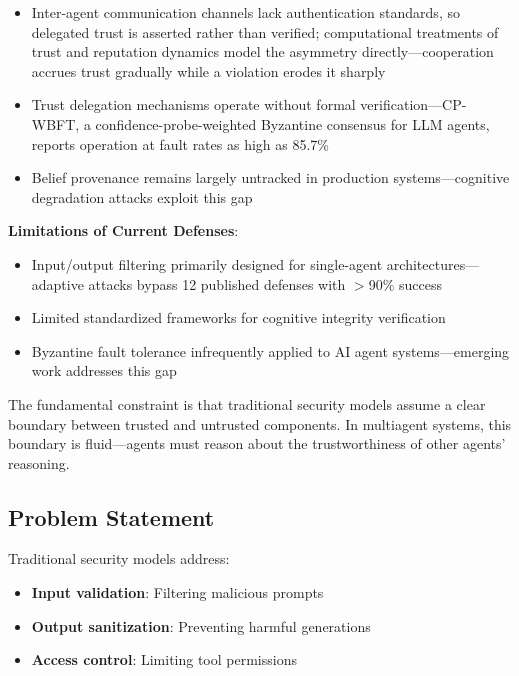 \documentclass[
]{article}
\begin{document}
\begin{itemize}
\item Inter-agent communication channels lack authentication standards, so delegated trust is asserted rather than verified; computational treatments of trust and reputation dynamics model the asymmetry directly---cooperation accrues trust gradually while a violation erodes it sharply \cite{trustdynamics2025}
\item Trust delegation mechanisms operate without formal verification---CP-WBFT, a confidence-probe-weighted Byzantine consensus for LLM agents, reports operation at fault rates as high as 85.7\% \cite{cpwbft2025}
\item Belief provenance remains largely untracked in production systems---cognitive degradation attacks exploit this gap \cite{cdr2025}
\end{itemize}

\textbf{Limitations of Current Defenses}:

\begin{itemize}
\item Input/output filtering primarily designed for single-agent architectures---adaptive attacks bypass 12 published defenses with $>$90\% success \cite{adaptive2025attacks}
\item Limited standardized frameworks for cognitive integrity verification
\item Byzantine fault tolerance infrequently applied to AI agent systems---emerging work addresses this gap \cite{jo2025byzantine}
\end{itemize}

The fundamental constraint is that traditional security models assume a
clear boundary between trusted and untrusted components. In multiagent
systems, this boundary is fluid---agents must reason about the
trustworthiness of other agents' reasoning.

\subsection{Problem Statement}\label{sec:problem}

Traditional security models address:

\begin{itemize}
\item \textbf{Input validation}: Filtering malicious prompts
\item \textbf{Output sanitization}: Preventing harmful generations
\item \textbf{Access control}: Limiting tool permissions
\end{itemize}
\end{document}

